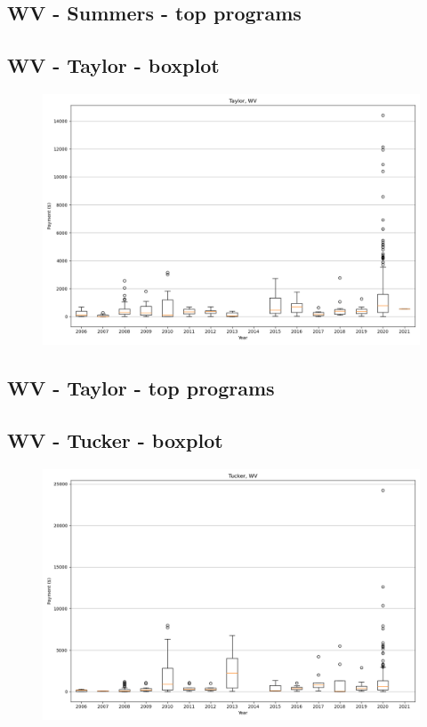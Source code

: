 \subsection*{WV - Summers - top programs}

\newpage
\subsection*{WV - Taylor - boxplot}
\begin{figure}[h]
\centering
\includegraphics[width=7in]{../output/boxplots/counties/Taylor-WV_boxplot.png}
\end{figure}


\subsection*{WV - Taylor - top programs}

\newpage
\subsection*{WV - Tucker - boxplot}
\begin{figure}[h]
\centering
\includegraphics[width=7in]{../output/boxplots/counties/Tucker-WV_boxplot.png}
\end{figure}


